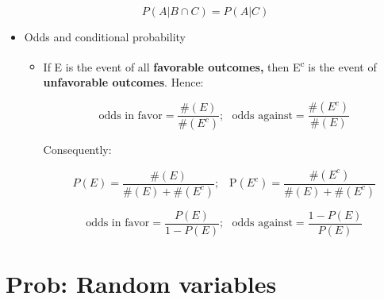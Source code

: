 \documentclass[12pt]{report}
\renewcommand{\_}{\kern-1.5pt\textunderscore\kern-1.5pt}
\begin{document}
\begin{adjustwidth}{1.0in}{0.0in}
 \[ P \left( A \vert B \cap C \right) =P \left( A \vert C \right)  \] \par

\end{adjustwidth}

\begin{itemize}
	\item Odds and conditional probability\par

\begin{itemize}
	\item If E is the event of all \textbf{favorable outcomes,} then E\textsuperscript{c} is the event of \textbf{unfavorable outcomes}. Hence:\par

 \[ \mathrm{\text{odds in favor}}=\frac{\# \left( E \right) }{\# \left( E^{c} \right) };~~~\mathrm{\text{odds against}}=\frac{\# \left( E^{c} \right) }{\# \left( E \right) } \] \par

Consequently:\par

 \[ P \left( E \right) =\frac{\# \left( E \right) }{\# \left( E \right) +\# \left( E^{c} \right) }\text{;~~ P} \left( E^{c} \right) =\frac{\# \left( E^{c} \right) }{\# \left( E \right) +\# \left( E^{c} \right) } \] \par

 \[ \mathrm{\text{odds in favor}}=\frac{P \left( E \right) }{1-P \left( E \right) };~~~\mathrm{\text{odds against}}=\frac{1-P \left( E \right) }{P \left( E \right) } \] \par


\end{itemize}
\end{itemize}\section*{Prob: Random variables}
\end{document}
